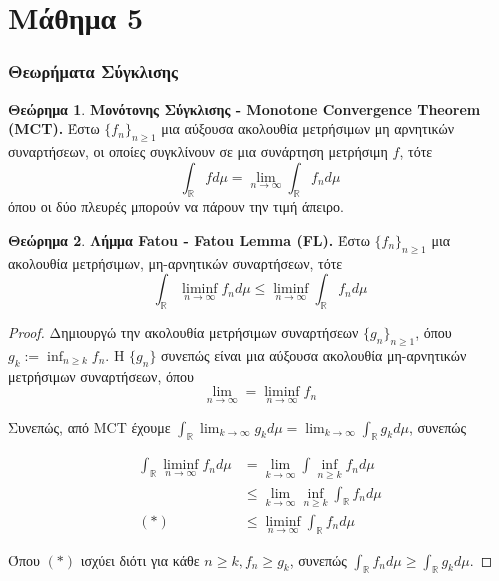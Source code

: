\documentclass[12pt,a4paper]{article}
\theoremstyle{definition}
\numberwithin{equation}{section}
\newtheorem{theorima}{Θεώρημα}
\begin{document}
{\begin{itemize}
\pagebreak
\end{itemize}
\section{Μάθημα 5}
\label{sec:org902b7c3}

\subsubsection{Θεωρήματα Σύγκλισης}
\label{sec:org59640fb}
\begin{theorima}\textbf{Μονότονης Σύγκλισης - Monotone Convergence Theorem (MCT).} Έστω $\{f_n\}_{n\geq 1}$ μια αύξουσα ακολουθία μετρήσιμων μη αρνητικών συναρτήσεων, οι οποίες
  συγκλίνουν σε μια συνάρτηση μετρήσιμη $f$, τότε
  $$ \int_\mathbb{R} f d\mu = \lim_{n\rightarrow \infty} \int_\mathbb{R} f_n d\mu $$
  όπου οι δύο πλευρές μπορούν να πάρουν την τιμή άπειρο.
\end{theorima}

\begin{theorima}\textbf{Λήμμα Fatou - Fatou Lemma (FL).} Έστω $\{f_n\}_{n\geq 1}$ μια ακολουθία μετρήσιμων, μη-αρνητικών συναρτήσεων, τότε
$$\int_\mathbb{R} \liminf_{n\rightarrow \infty} f_n d\mu  \leq \liminf_{n\rightarrow \infty} \int_\mathbb{R} f_n d\mu $$
\end{theorima}

\begin{proof}
Δημιουργώ την ακολουθία μετρήσιμων συναρτήσεων $\{g_n\}_{n\geq 1}$, όπου $g_k:= \inf_{n\geq k} f_n$.
Η $\{g_n\}$ συνεπώς είναι μια αύξουσα ακολουθία μη-αρνητικών μετρήσιμων συναρτήσεων, όπου
$$\lim_{n\rightarrow \infty} = \liminf_{n\rightarrow \infty} f_n$$

Συνεπώς, από MCT έχουμε $\int_\mathbb{R} \lim_{k\rightarrow \infty} g_k d\mu = \lim_{k\rightarrow \infty} \int_\mathbb{R} g_k d\mu$, συνεπώς

\begin{align*}
\int_\mathbb{R} \liminf_{n\rightarrow \infty} f_n d\mu &= \lim_{k\rightarrow \infty} \int \inf_{n\geq k} f_n d\mu\\
&\leq \lim_{k\rightarrow \infty} \inf_{n\geq k} \int_\mathbb{R} f_n d\mu \\
(*) \qquad &\leq \liminf_{n\rightarrow \infty} \int_\mathbb{R} f_n d\mu
\end{align*}

Όπου $(*)$ ισχύει διότι για κάθε $n\geq k, f_n \geq g_k$, συνεπώς $\int_\mathbb{R} f_n d\mu \geq \int_\mathbb{R} g_k d\mu$.
\end{proof}\\


}
\end{document}

